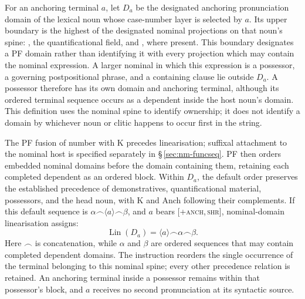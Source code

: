 For an anchoring terminal $a$, let $D_a$ be the designated anchoring
pronunciation domain of the lexical noun whose case-number layer is selected
by $a$. Its upper boundary is the highest of the designated nominal
projections on that noun's spine: , the quantificational
field, and , where present. This boundary designates a PF
domain rather than identifying it with every projection which may contain
the nominal expression. A larger nominal in which this expression is a possessor, a governing
postpositional phrase, and a containing clause lie outside $D_a$. A possessor therefore
has its own domain and anchoring terminal, although its ordered terminal
sequence occurs as a dependent inside the host noun's domain. This definition uses the
nominal spine to identify ownership; it does not identify a domain by whichever
noun or clitic happens to occur first in the string.

The PF fusion of number with K precedes linearisation; suffixal attachment
to the nominal host is specified separately in §\,\ref{sec:nm-funcseq}. PF then orders
embedded nominal domains before the domain containing them, retaining each
completed dependent as an ordered block. Within $D_a$, the
default order preserves the established precedence of demonstratives,
quantificational material, possessors, and the head noun, with K and Anch
following their complements. If this default sequence is
$\alpha\mathbin{\frown}\langle a\rangle\mathbin{\frown}\beta$, and $a$
bears [\textsc{+anch,\,\textminus{}shr}], nominal-domain linearisation assigns:
\[
  \operatorname{Lin}(D_a)
    = \langle a\rangle\mathbin{\frown}\alpha\mathbin{\frown}\beta.
\]
Here $\frown$ is concatenation, while $\alpha$ and $\beta$ are ordered
sequences that may contain completed dependent domains. The instruction
reorders the single occurrence of the terminal belonging to this nominal
spine; every other precedence relation is retained. An anchoring terminal
inside a possessor remains within that possessor's block, and $a$ receives no
second pronunciation at its syntactic source.

